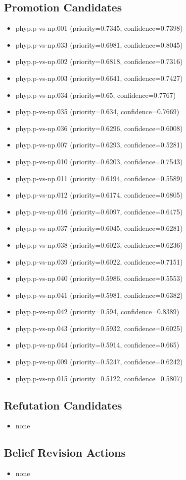 \documentclass[
]{article}
\newcounter{none} %
\providecommand{\tightlist}{%
  \setlength{\itemsep}{0pt}\setlength{\parskip}{0pt}}
\begin{document}
\subsection{Promotion Candidates}\label{promotion-candidates}

\begin{itemize}
\tightlist
\item
  phyp.p-vs-np.001 (priority=0.7345, confidence=0.7398)
\item
  phyp.p-vs-np.033 (priority=0.6981, confidence=0.8045)
\item
  phyp.p-vs-np.002 (priority=0.6818, confidence=0.7316)
\item
  phyp.p-vs-np.003 (priority=0.6641, confidence=0.7427)
\item
  phyp.p-vs-np.034 (priority=0.65, confidence=0.7767)
\item
  phyp.p-vs-np.035 (priority=0.634, confidence=0.7669)
\item
  phyp.p-vs-np.036 (priority=0.6296, confidence=0.6008)
\item
  phyp.p-vs-np.007 (priority=0.6293, confidence=0.5281)
\item
  phyp.p-vs-np.010 (priority=0.6203, confidence=0.7543)
\item
  phyp.p-vs-np.011 (priority=0.6194, confidence=0.5589)
\item
  phyp.p-vs-np.012 (priority=0.6174, confidence=0.6805)
\item
  phyp.p-vs-np.016 (priority=0.6097, confidence=0.6475)
\item
  phyp.p-vs-np.037 (priority=0.6045, confidence=0.6281)
\item
  phyp.p-vs-np.038 (priority=0.6023, confidence=0.6236)
\item
  phyp.p-vs-np.039 (priority=0.6022, confidence=0.7151)
\item
  phyp.p-vs-np.040 (priority=0.5986, confidence=0.5553)
\item
  phyp.p-vs-np.041 (priority=0.5981, confidence=0.6382)
\item
  phyp.p-vs-np.042 (priority=0.594, confidence=0.8389)
\item
  phyp.p-vs-np.043 (priority=0.5932, confidence=0.6025)
\item
  phyp.p-vs-np.044 (priority=0.5914, confidence=0.665)
\item
  phyp.p-vs-np.009 (priority=0.5247, confidence=0.6242)
\item
  phyp.p-vs-np.015 (priority=0.5122, confidence=0.5807)
\end{itemize}

\subsection{Refutation Candidates}\label{refutation-candidates}

\begin{itemize}
\tightlist
\item
  none
\end{itemize}

\subsection{Belief Revision Actions}\label{belief-revision-actions}

\begin{itemize}
\tightlist
\item
  none
\end{itemize}
\end{document}

